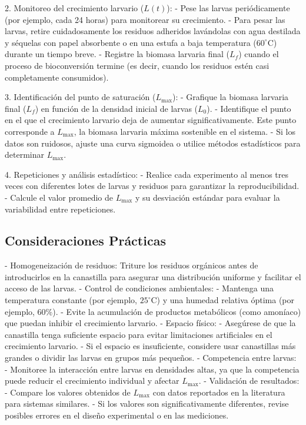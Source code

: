 \documentclass[12pt]{article}
\begin{document}
2. Monitoreo del crecimiento larvario ($L(t)$):
   - Pese las larvas periódicamente (por ejemplo, cada 24 horas) para monitorear su crecimiento.
   - Para pesar las larvas, retire cuidadosamente los residuos adheridos lavándolas con agua destilada y séquelas con papel absorbente o en una estufa a baja temperatura ($60^\circ \text{C}$) durante un tiempo breve.
   - Registre la biomasa larvaria final ($L_f$) cuando el proceso de bioconversión termine (es decir, cuando los residuos estén casi completamente consumidos).

3. Identificación del punto de saturación ($L_{\text{max}}$):
   - Grafique la biomasa larvaria final ($L_f$) en función de la densidad inicial de larvas ($L_0$).
   - Identifique el punto en el que el crecimiento larvario deja de aumentar significativamente. Este punto corresponde a $L_{\text{max}}$, la biomasa larvaria máxima sostenible en el sistema.
   - Si los datos son ruidosos, ajuste una curva sigmoidea o utilice métodos estadísticos para determinar $L_{\text{max}}$.

4. Repeticiones y análisis estadístico:
   - Realice cada experimento al menos tres veces con diferentes lotes de larvas y residuos para garantizar la reproducibilidad.
   - Calcule el valor promedio de $L_{\text{max}}$ y su desviación estándar para evaluar la variabilidad entre repeticiones.

\subsection{Consideraciones Prácticas}

- Homogeneización de residuos: Triture los residuos orgánicos antes de introducirlos en la canastilla para asegurar una distribución uniforme y facilitar el acceso de las larvas.
- Control de condiciones ambientales:
  - Mantenga una temperatura constante (por ejemplo, $25^\circ \text{C}$) y una humedad relativa óptima (por ejemplo, $60\%$).
  - Evite la acumulación de productos metabólicos (como amoníaco) que puedan inhibir el crecimiento larvario.
- Espacio físico:
  - Asegúrese de que la canastilla tenga suficiente espacio para evitar limitaciones artificiales en el crecimiento larvario.
  - Si el espacio es insuficiente, considere usar canastillas más grandes o dividir las larvas en grupos más pequeños.
- Competencia entre larvas:
  - Monitoree la interacción entre larvas en densidades altas, ya que la competencia puede reducir el crecimiento individual y afectar $L_{\text{max}}$.
- Validación de resultados:
  - Compare los valores obtenidos de $L_{\text{max}}$ con datos reportados en la literatura para sistemas similares.
  - Si los valores son significativamente diferentes, revise posibles errores en el diseño experimental o en las mediciones.
\end{document}
